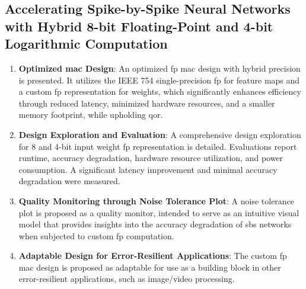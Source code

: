 \subsection{Accelerating Spike-by-Spike Neural Networks with Hybrid 8-bit Floating-Point and 4-bit Logarithmic Computation}
\begin{enumerate}
	\item \textbf{Optimized \gls{mac} Design}: 
	An optimized \gls{fp} \gls{mac} design with hybrid precision is presented. It utilizes the IEEE 754 single-precision \gls{fp} for feature maps and a custom \gls{fp} representation for weights, which significantly enhances efficiency through reduced latency, minimized hardware resources, and a smaller memory footprint, while upholding \gls{qor}.
	
	\item \textbf{Design Exploration and Evaluation}: 
	A comprehensive design exploration for 8 and 4-bit input weight \gls{fp} representation is detailed. Evaluations report runtime, accuracy degradation, hardware resource utilization, and power consumption. A significant latency improvement and minimal accuracy degradation were measured.
	
	\item \textbf{Quality Monitoring through Noise Tolerance Plot}: 
	A noise tolerance plot is proposed as a quality monitor, intended to serve as an intuitive visual model that provides insights into the accuracy degradation of \gls{sbs} networks when subjected to custom \gls{fp} computation.
	
	\item \textbf{Adaptable Design for Error-Resilient Applications}: 
	The custom \gls{fp} \gls{mac} design is proposed as adaptable for use as a building block in other error-resilient applications, such as image/video processing.
\end{enumerate}

